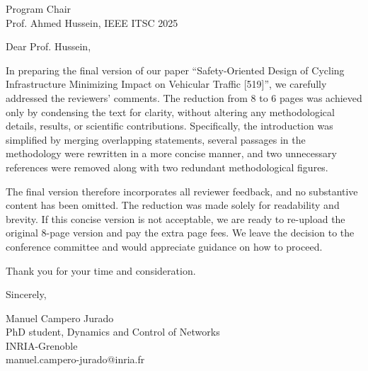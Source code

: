 \documentclass[12pt]{letter}
\begin{document}
\begin{letter}{%
Program Chair\\
Prof. Ahmed Hussein, IEEE ITSC 2025\\
}

\opening{Dear Prof. Hussein,}

In preparing the final version of our paper “Safety-Oriented Design of Cycling Infrastructure Minimizing Impact on Vehicular Traffic [519]”, we carefully addressed the reviewers’ comments. The reduction from 8 to 6 pages was achieved only by condensing the text for clarity, without altering any methodological details, results, or scientific contributions. Specifically, the introduction was simplified by merging overlapping statements, several passages in the methodology were rewritten in a more concise manner, and two unnecessary references were removed along with two redundant methodological figures.

The final version therefore incorporates all reviewer feedback, and no substantive content has been omitted. The reduction was made solely for readability and brevity. If this concise version is not acceptable, we are ready to re-upload the original 8-page version and pay the extra page fees. We leave the decision to the conference committee and would appreciate guidance on how to proceed.

Thank you for your time and consideration. 
\closing{Sincerely,}






\vspace{-2cm} %
\noindent
Manuel Campero Jurado\\
PhD student, Dynamics and Control of Networks\\
INRIA-Grenoble\\
manuel.campero-jurado@inria.fr
\end{letter}
\end{document}
